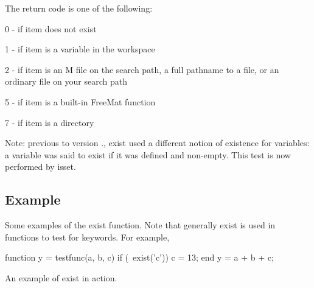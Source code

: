  The return code is one of the following\-: 
\begin{DoxyItemize}
\item 0 -\/ if {\ttfamily item} does not exist  
\item 1 -\/ if {\ttfamily item} is a variable in the workspace  
\item 2 -\/ if {\ttfamily item} is an M file on the search path, a full pathname to a file, or an ordinary file on your search path  
\item 5 -\/ if {\ttfamily item} is a built-\/in Free\-Mat function  
\item 7 -\/ if {\ttfamily item} is a directory  
\end{DoxyItemize}Note\-: previous to version {.}, {\ttfamily exist} used a different notion of existence for variables\-: a variable was said to exist if it was defined and non-\/empty. This test is now performed by {\ttfamily isset}. \hypertarget{variables_struct_Example}{}\subsection{Example}\label{variables_struct_Example}
Some examples of the {\ttfamily exist} function. Note that generally {\ttfamily exist} is used in functions to test for keywords. For example, \begin{DoxyVerb}  function y = testfunc(a, b, c)
  if (~exist('c'))
    c = 13;
  end
  y = a + b + c;
\end{DoxyVerb}
 An example of {\ttfamily exist} in action.


